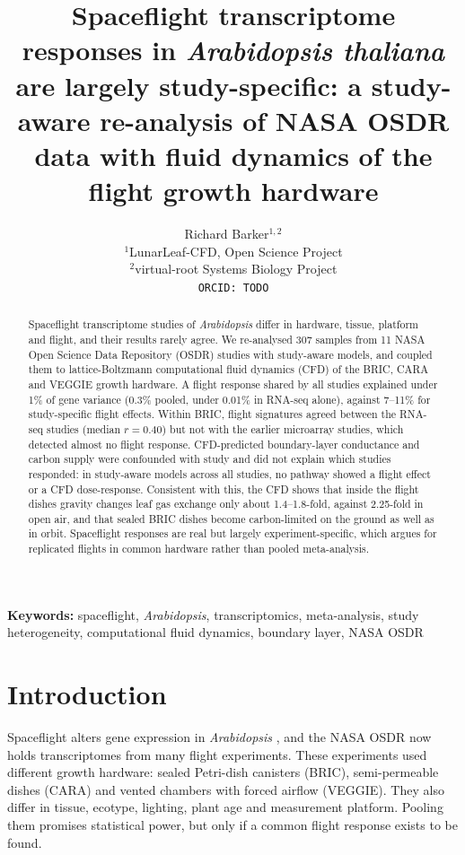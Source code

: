 \documentclass[11pt,a4paper]{article}
\title{Spaceflight transcriptome responses in \textit{Arabidopsis thaliana} are largely study-specific: a study-aware re-analysis of NASA OSDR data with fluid dynamics of the flight growth hardware}
\author{
Richard Barker$^{1,2}$ \\
$^{1}$LunarLeaf-CFD, Open Science Project \\
$^{2}$virtual-root Systems Biology Project \\
\texttt{ORCID: TODO}
}
\date{}
\begin{document}
\maketitle

\begin{abstract}
Spaceflight transcriptome studies of \textit{Arabidopsis} differ in hardware, tissue, platform and flight, and their results rarely agree. We re-analysed 307 samples from 11 NASA Open Science Data Repository (OSDR) studies with study-aware models, and coupled them to lattice-Boltzmann computational fluid dynamics (CFD) of the BRIC, CARA and VEGGIE growth hardware. A flight response shared by all studies explained under 1\% of gene variance (0.3\% pooled, under 0.01\% in RNA-seq alone), against 7--11\% for study-specific flight effects. Within BRIC, flight signatures agreed between the RNA-seq studies (median $r = 0.40$) but not with the earlier microarray studies, which detected almost no flight response. CFD-predicted boundary-layer conductance and carbon supply were confounded with study and did not explain which studies responded: in study-aware models across all studies, no pathway showed a flight effect or a CFD dose-response. Consistent with this, the CFD shows that inside the flight dishes gravity changes leaf gas exchange only about 1.4--1.8-fold, against 2.25-fold in open air, and that sealed BRIC dishes become carbon-limited on the ground as well as in orbit. Spaceflight responses are real but largely experiment-specific, which argues for replicated flights in common hardware rather than pooled meta-analysis.
\end{abstract}

\textbf{Keywords:} spaceflight, \textit{Arabidopsis}, transcriptomics, meta-analysis, study heterogeneity, computational fluid dynamics, boundary layer, NASA OSDR

\section*{Introduction}

Spaceflight alters gene expression in \textit{Arabidopsis} \citep{paul2017}, and the NASA OSDR now holds transcriptomes from many flight experiments. These experiments used different growth hardware: sealed Petri-dish canisters (BRIC), semi-permeable dishes (CARA) and vented chambers with forced airflow (VEGGIE). They also differ in tissue, ecotype, lighting, plant age and measurement platform. Pooling them promises statistical power, but only if a common flight response exists to be found.
\end{document}
